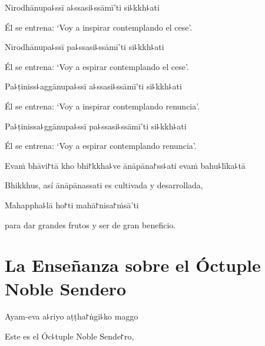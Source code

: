 Nirodhānupa꜕ssī a꜕ssasi꜕ssāmī'ti si꜕kkh꜕ati

\begin{english}
  Él se entrena: `Voy a inspirar contemplando el cese'.
\end{english}

Nirodhānupa꜕ssī pa꜕ssasi꜕ssāmī'ti si꜕kkh꜕ati

\begin{english}
  Él se entrena: `Voy a espirar contemplando el cese'.
\end{english}

Pa꜕ṭiniss꜕aggānupa꜕ssī a꜕ssasi꜕ssāmī'ti si꜕kkh꜕ati

\begin{english}
  Él se entrena: `Voy a inspirar contemplando renuncia'.
\end{english}

Pa꜕ṭinissa꜕ggānupa꜕ssī pa꜕ssasi꜕ssāmī'ti si꜕kkh꜕ati

\begin{english}
  Él se entrena: `Voy a espirar contemplando renuncia'.
\end{english}

Evaṁ bhāvi꜓tā kho bhi꜓kkha꜕ve ānāpāna꜓ss꜕ati evaṁ bahu꜕līka꜕tā

\begin{english}
  Bhikkhus, así ānāpānassati es cultivada y desarrollada,
\end{english}

Mahappha꜕lā ho꜓ti mahā꜓nisa꜓ṁsā'ti

\begin{english}
  para dar grandes frutos y ser de gran beneficio.
\end{english}


\chapter[El Óctuple Noble Sendero]{La Enseñanza sobre el Óctuple Noble Sendero}




\begin{leader}
\end{leader}

Ayam-eva a꜕riyo aṭṭha꜓ṅgi꜕ko maggo

\begin{english}
	Este es el Óc꜕tuple Noble Sende꜓ro,
\end{english}

